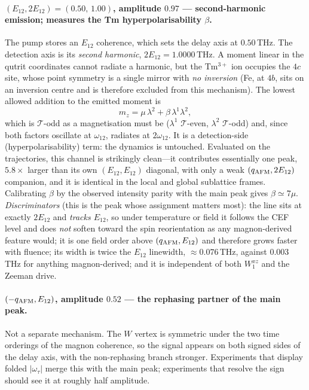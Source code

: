 \documentclass[11pt]{article}
\newcommand{\qafm}{q_{\rm AFM}}
\begin{document}
\paragraph{$(E_{12},2E_{12})=(0.50,\,1.00)$, amplitude $0.97$ ---
second-harmonic emission; measures the Tm hyperpolarisability $\beta$.}
The pump stores an $E_{12}$ coherence, which sets the delay axis at
$0.50$\,THz.  The detection axis is its \emph{second harmonic},
$2E_{12}=1.0000$\,THz.  A moment linear in the qutrit coordinates
cannot radiate a harmonic, but the Tm$^{3+}$ ion occupies the $4c$
site, whose point symmetry is a single mirror with \emph{no inversion}
(Fe, at $4b$, sits on an inversion centre and is therefore excluded
from this mechanism).  The lowest allowed addition to the emitted
moment is
\begin{equation}
  m_z=\mu\,\lambda^2+\beta\,\lambda^1\lambda^2 ,
\end{equation}
which is $\mathcal T$-odd as a magnetisation must be ($\lambda^1$
$\mathcal T$-even, $\lambda^2$ $\mathcal T$-odd) and, since both factors
oscillate at $\omega_{12}$, radiates at $2\omega_{12}$.  It is a
detection-side (hyperpolarisability) term: the dynamics is untouched.
Evaluated on the trajectories, this channel is strikingly clean---it
contributes essentially one peak, $5.8\times$ larger than its own
$(E_{12},E_{12})$ diagonal, with only a weak $(\qafm,2E_{12})$
companion, and it is identical in the local and global sublattice
frames.  Calibrating $\beta$ by the observed intensity parity with the
main peak gives $\beta\simeq7\mu$.
\emph{Discriminators} (this is the peak whose assignment matters most):
the line sits at exactly $2E_{12}$ and \emph{tracks $E_{12}$}, so under
temperature or field it follows the CEF level and does \emph{not}
soften toward the spin reorientation as any magnon-derived feature
would; it is one field order above $(\qafm,E_{12})$ and therefore grows
faster with fluence; its width is twice the $E_{12}$ linewidth,
$\approx0.076$\,THz, against $0.003$\,THz for anything magnon-derived;
and it is independent of both $W^{xz}_1$ and the Zeeman drive.

\paragraph{$(-\qafm,E_{12})$, amplitude $0.52$ --- the rephasing
partner of the main peak.}
Not a separate mechanism.  The $W$ vertex is symmetric under the two
time orderings of the magnon coherence, so the signal appears on both
signed sides of the delay axis, with the non-rephasing branch stronger.
Experiments that display folded $|\omega_\tau|$ merge this with the
main peak; experiments that resolve the sign should see it at roughly
half amplitude.
\end{document}
